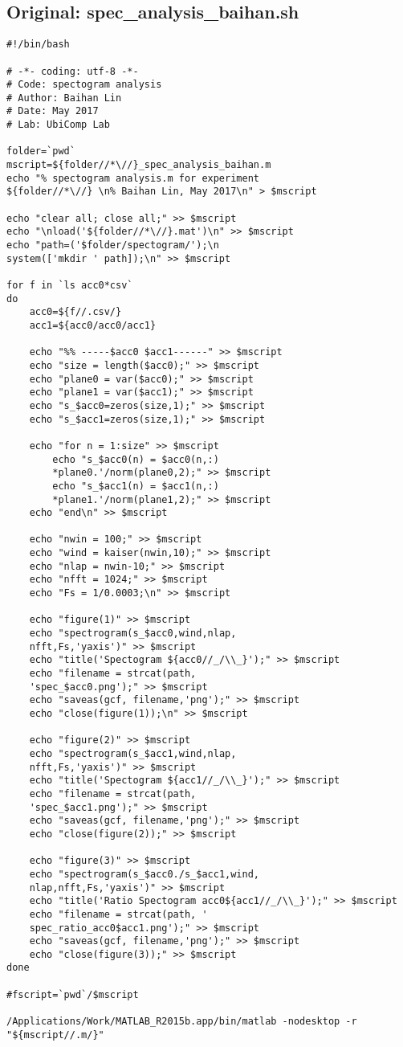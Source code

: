 \documentclass{sigchi}
\begin{document}
\subsection{Original: spec\_analysis\_baihan.sh}\label{ss:spc_ana.sh}
\begin{lstlisting}
#!/bin/bash

# -*- coding: utf-8 -*-
# Code: spectogram analysis
# Author: Baihan Lin
# Date: May 2017
# Lab: UbiComp Lab

folder=`pwd`
mscript=${folder//*\//}_spec_analysis_baihan.m
echo "% spectogram analysis.m for experiment 
${folder//*\//} \n% Baihan Lin, May 2017\n" > $mscript

echo "clear all; close all;" >> $mscript
echo "\nload('${folder//*\//}.mat')\n" >> $mscript
echo "path=('$folder/spectogram/');\n
system(['mkdir ' path]);\n" >> $mscript

for f in `ls acc0*csv`
do
    acc0=${f//.csv/}
    acc1=${acc0/acc0/acc1}

	echo "%% -----$acc0 $acc1------" >> $mscript
	echo "size = length($acc0);" >> $mscript
	echo "plane0 = var($acc0);" >> $mscript
	echo "plane1 = var($acc1);" >> $mscript
	echo "s_$acc0=zeros(size,1);" >> $mscript
	echo "s_$acc1=zeros(size,1);" >> $mscript
	
	echo "for n = 1:size" >> $mscript
    	echo "s_$acc0(n) = $acc0(n,:)
        *plane0.'/norm(plane0,2);" >> $mscript
    	echo "s_$acc1(n) = $acc1(n,:)
        *plane1.'/norm(plane1,2);" >> $mscript
	echo "end\n" >> $mscript

	echo "nwin = 100;" >> $mscript
	echo "wind = kaiser(nwin,10);" >> $mscript
	echo "nlap = nwin-10;" >> $mscript
	echo "nfft = 1024;" >> $mscript
	echo "Fs = 1/0.0003;\n" >> $mscript

	echo "figure(1)" >> $mscript
	echo "spectrogram(s_$acc0,wind,nlap,
    nfft,Fs,'yaxis')" >> $mscript
	echo "title('Spectogram ${acc0//_/\\_}');" >> $mscript
	echo "filename = strcat(path, 
    'spec_$acc0.png');" >> $mscript
	echo "saveas(gcf, filename,'png');" >> $mscript
	echo "close(figure(1));\n" >> $mscript

	echo "figure(2)" >> $mscript
	echo "spectrogram(s_$acc1,wind,nlap,
    nfft,Fs,'yaxis')" >> $mscript
	echo "title('Spectogram ${acc1//_/\\_}');" >> $mscript
	echo "filename = strcat(path, 
    'spec_$acc1.png');" >> $mscript
	echo "saveas(gcf, filename,'png');" >> $mscript
	echo "close(figure(2));" >> $mscript

	echo "figure(3)" >> $mscript
	echo "spectrogram(s_$acc0./s_$acc1,wind,
    nlap,nfft,Fs,'yaxis')" >> $mscript
	echo "title('Ratio Spectogram acc0${acc1//_/\\_}');" >> $mscript
	echo "filename = strcat(path, '
    spec_ratio_acc0$acc1.png');" >> $mscript
	echo "saveas(gcf, filename,'png');" >> $mscript
	echo "close(figure(3));" >> $mscript
done

#fscript=`pwd`/$mscript

/Applications/Work/MATLAB_R2015b.app/bin/matlab -nodesktop -r "${mscript//.m/}"

\end{lstlisting}
\end{document}
